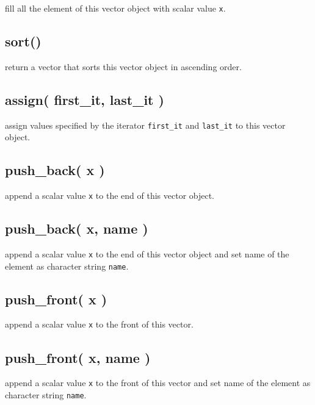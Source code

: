 \documentclass[]{book}
\begin{document}
fill all the element of this vector object with scalar value \texttt{x}.

\hypertarget{sort}{%
\subsection{sort()}\label{sort}}

return a vector that sorts this vector object in ascending order.

\hypertarget{assign-first_it-last_it}{%
\subsection{assign( first\_it, last\_it )}\label{assign-first_it-last_it}}

assign values specified by the iterator \texttt{first\_it} and \texttt{last\_it} to this vector object.

\hypertarget{push_back-x}{%
\subsection{push\_back( x )}\label{push_back-x}}

append a scalar value \texttt{x} to the end of this vector object.

\hypertarget{push_back-x-name}{%
\subsection{push\_back( x, name )}\label{push_back-x-name}}

append a scalar value \texttt{x} to the end of this vector object and set name of the element as character string \texttt{name}.

\hypertarget{push_front-x}{%
\subsection{push\_front( x )}\label{push_front-x}}

append a scalar value \texttt{x} to the front of this vector.

\hypertarget{push_front-x-name}{%
\subsection{push\_front( x, name )}\label{push_front-x-name}}

append a scalar value \texttt{x} to the front of this vector and set name of the element as character string \texttt{name}.
\end{document}
